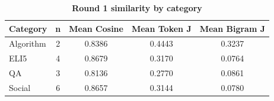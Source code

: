 \begin{table}[htbp]
\centering
\caption{\textbf{Round 1 similarity by category}}
\label{tab:round1-similarity-by-category}
\renewcommand{\arraystretch}{1.4}
\begin{tabular}{|l|c|c|c|c|}
\hline
\textbf{Category} & \textbf{n} & \textbf{Mean Cosine} & \textbf{Mean Token J} & \textbf{Mean Bigram J} \\
\hline
Algorithm & 2 & 0.8386 & 0.4443 & 0.3237 \\
\hline
ELI5 & 4 & 0.8679 & 0.3170 & 0.0764 \\
\hline
QA & 3 & 0.8136 & 0.2770 & 0.0861 \\
\hline
Social & 6 & 0.8657 & 0.3144 & 0.0780 \\
\hline
\end{tabular}
\end{table}
